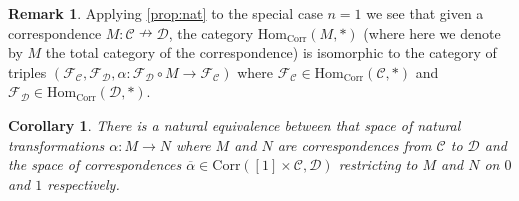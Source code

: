\documentclass[a4paper, reqno]{amsart}
\newtheorem{cor}[theorem]{Corollary}
\theoremstyle{definition}
\newtheorem{remark}[theorem]{Remark}
\newcommand\cC{\mathscr C}
\newcommand\cD{\mathscr D}
\newcommand\cF{\mathscr F}
\newcommand\mor{\mathrm{Hom}}
\newcommand\corr{\mathrm{Corr}}
\begin{document}
\begin{remark}\label{rem:nat}
Applying \cref{prop:nat} to the special case $n=1$ we see that given a correspondence $M:\cC\nrightarrow\cD$, the category $\mor_\corr(M,*)$ (where here we denote by $M$ the total category of the correspondence) is isomorphic to the category of triples $(\cF_\cC,\cF_\cD, \alpha:\cF_\cD\circ M\rightarrow\cF_\cC)$ where $\cF_\cC\in\mor_\corr(\cC,*)$ and $\cF_\cD\in\mor_\corr(\cD,*)$.
\end{remark}
\begin{cor}\label{cor:nat}
There is a natural equivalence between that space of natural transformations $\alpha:M\rightarrow N$ where $M$ and $N$ are correspondences from $\cC$ to $\cD$ and the
space of correspondences $\overline{\alpha}\in\corr([1]\times\cC,\cD)$ restricting to $M$ and $N$ on $0$ and $1$ respectively.
\end{cor}
\end{document}
